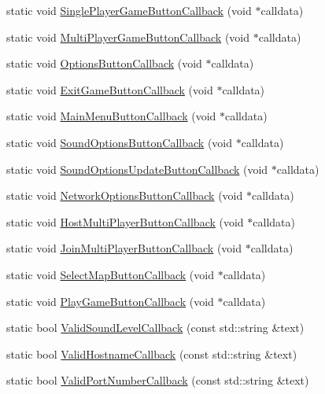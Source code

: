 \begin{DoxyCompactItemize}
\item 
static void \hyperlink{classCApplicationData_a239a28599cbb6762c21306a4a03c6202}{Single\+Player\+Game\+Button\+Callback} (void $\ast$calldata)
\item 
static void \hyperlink{classCApplicationData_afabb120415cdadf67edca20c67e8c6fa}{Multi\+Player\+Game\+Button\+Callback} (void $\ast$calldata)
\item 
static void \hyperlink{classCApplicationData_a3647cf78eb59689b901d4204c81555b4}{Options\+Button\+Callback} (void $\ast$calldata)
\item 
static void \hyperlink{classCApplicationData_a6a2c934fee258ccdb2a4a70c075f79fd}{Exit\+Game\+Button\+Callback} (void $\ast$calldata)
\item 
static void \hyperlink{classCApplicationData_a4410839118b5b74dab798ad7be6f703b}{Main\+Menu\+Button\+Callback} (void $\ast$calldata)
\item 
static void \hyperlink{classCApplicationData_a7169395ea835eaa9c98188d1b3583534}{Sound\+Options\+Button\+Callback} (void $\ast$calldata)
\item 
static void \hyperlink{classCApplicationData_ae63c8ca19ddeb92a3aaf0a5d67d09e58}{Sound\+Options\+Update\+Button\+Callback} (void $\ast$calldata)
\item 
static void \hyperlink{classCApplicationData_ad41dbc2f54ee638aa64a1d0c22b3fba9}{Network\+Options\+Button\+Callback} (void $\ast$calldata)
\item 
static void \hyperlink{classCApplicationData_a9f804f7f34e1f0abf8c395cd0032d811}{Host\+Multi\+Player\+Button\+Callback} (void $\ast$calldata)
\item 
static void \hyperlink{classCApplicationData_a4fa8cf7a67c0ae980d38e1fe7b967f41}{Join\+Multi\+Player\+Button\+Callback} (void $\ast$calldata)
\item 
static void \hyperlink{classCApplicationData_a5f915dc03205b67ca79f4dcfd7b43f5a}{Select\+Map\+Button\+Callback} (void $\ast$calldata)
\item 
static void \hyperlink{classCApplicationData_a659aa43022e92610c2f8cc182eab1b8e}{Play\+Game\+Button\+Callback} (void $\ast$calldata)
\item 
static bool \hyperlink{classCApplicationData_ae3216a4fccd68c9657d7e936b1a6df67}{Valid\+Sound\+Level\+Callback} (const std\+::string \&text)
\item 
static bool \hyperlink{classCApplicationData_aad04c7da1cc86bef623efda1019907fd}{Valid\+Hostname\+Callback} (const std\+::string \&text)
\item 
static bool \hyperlink{classCApplicationData_adc8125cc7c4ad01bdd43e6550c6ba133}{Valid\+Port\+Number\+Callback} (const std\+::string \&text)
\end{DoxyCompactItemize}
